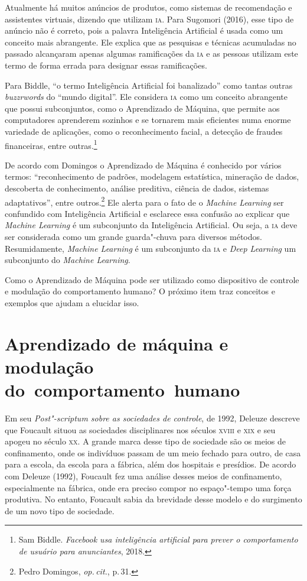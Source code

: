 Atualmente há muitos anúncios de produtos, como sistemas de recomendação
e assistentes virtuais, dizendo que utilizam \textsc{ia}. Para Sugomori (2016),
esse tipo de anúncio não é correto, pois a palavra Inteligência
Artificial é usada como um conceito mais abrangente. Ele explica que as
pesquisas e técnicas acumuladas no passado alcançaram apenas algumas
ramificações da \textsc{ia} e as pessoas utilizam este termo de forma errada para
designar essas ramificações.

Para Biddle, ``o termo Inteligência Artificial foi banalizado''
como tantas outras \emph{buzzrwords} do ``mundo digital''. Ele considera
\textsc{ia} como um conceito abrangente que possui subconjuntos, como o
Aprendizado de Máquina, que permite aos computadores aprenderem sozinhos
e se tornarem mais eficientes numa enorme variedade de aplicações, como
o reconhecimento facial, a detecção de fraudes financeiras, entre outras.\footnote{Sam Biddle. \emph{Facebook usa inteligência artificial para prever o
comportamento de usuário para anunciantes}, 2018.}

De acordo com Domingos o Aprendizado de Máquina é conhecido por
vários termos: ``reconhecimento de padrões, modelagem estatística,
mineração de dados, descoberta de conhecimento, análise preditiva,
ciência de dados, sistemas adaptativos'', entre outros.\footnote{Pedro Domingos, \textit{op.\,cit.}, p.\,31.} Ele
alerta para o fato de o \emph{Machine Learning} ser confundido com
Inteligência Artificial e esclarece essa confusão ao explicar que
\emph{Machine Learning} é um subconjunto da Inteligência Artificial. Ou
seja, a \textsc{ia} deve ser considerada como um grande guarda"-chuva para
diversos métodos. Resumidamente, \emph{Machine Learning} é um subconjunto
da \textsc{ia} e \emph{Deep Learning} um subconjunto do \emph{Machine Learning}.

Como o Aprendizado de Máquina pode ser utilizado como dispositivo de
controle e modulação do comportamento humano? O próximo item traz
conceitos e exemplos que ajudam a elucidar isso.

\section{Aprendizado de máquina e modulação do~comportamento~humano}

Em seu \emph{Post"-scriptum sobre as sociedades de controle}, de 1992, Deleuze
descreve que Foucault situou as sociedades disciplinares nos
séculos \textsc{xviii} e \textsc{xix} e seu apogeu no século \textsc{xx}. A grande marca desse tipo
de sociedade são os meios de confinamento, onde os indivíduos passam de
um meio fechado para outro, de casa para a escola, da escola para a
fábrica, além dos hospitais e presídios. De acordo com Deleuze (1992),
Foucault fez uma análise desses meios de confinamento, especialmente na
fábrica, onde era preciso compor no espaço"-tempo uma força produtiva. No
entanto, Foucault sabia da brevidade desse modelo e do surgimento de um
novo tipo de sociedade.

